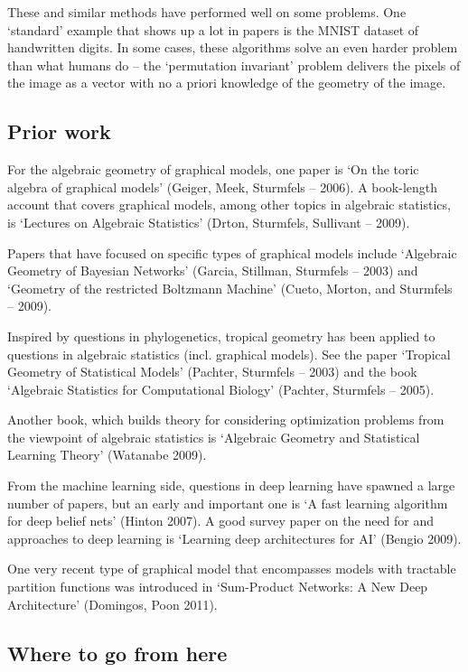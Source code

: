 \documentclass[12pt]{article}
\begin{document}
These and similar methods have performed well on some problems.  One `standard'
example that shows up a lot in papers is the MNIST dataset of handwritten
digits.  In some cases, these algorithms solve an even harder problem than what
humans do -- the `permutation invariant' problem delivers the pixels of the
image as a vector with no a priori knowledge of the geometry of the image.

\subsection{Prior work}

For the algebraic geometry of graphical models, one paper is `On the toric
algebra of graphical models' (Geiger, Meek, Sturmfels -- 2006).  A book-length
account that covers graphical models, among other topics in algebraic
statistics, is `Lectures on Algebraic Statistics' (Drton, Sturmfels, Sullivant
-- 2009).  

Papers that have focused on specific types of graphical models include
`Algebraic Geometry of Bayesian Networks' (Garcia, Stillman, Sturmfels -- 2003)
and `Geometry of the restricted Boltzmann Machine' (Cueto, Morton, and Sturmfels
-- 2009).  

Inspired by questions in phylogenetics, tropical geometry has been applied to
questions in algebraic statistics (incl. graphical models).  See the paper
`Tropical Geometry of Statistical Models' (Pachter, Sturmfels -- 2003) and the
book `Algebraic Statistics for Computational Biology' (Pachter, Sturmfels --
2005).

Another book, which builds theory for considering optimization problems from the
viewpoint of algebraic statistics is `Algebraic Geometry and Statistical
Learning Theory' (Watanabe 2009).

From the machine learning side, questions in deep learning have spawned a large
number of papers, but an early and important one is `A fast learning algorithm for
deep belief nets' (Hinton 2007).  A good survey paper on the need for and
approaches to deep learning is `Learning deep architectures for AI' (Bengio
2009).

One very recent type of graphical model that encompasses models with tractable
partition functions was introduced in `Sum-Product Networks: A New Deep
Architecture' (Domingos, Poon 2011).

\subsection{Where to go from here}
\end{document}

